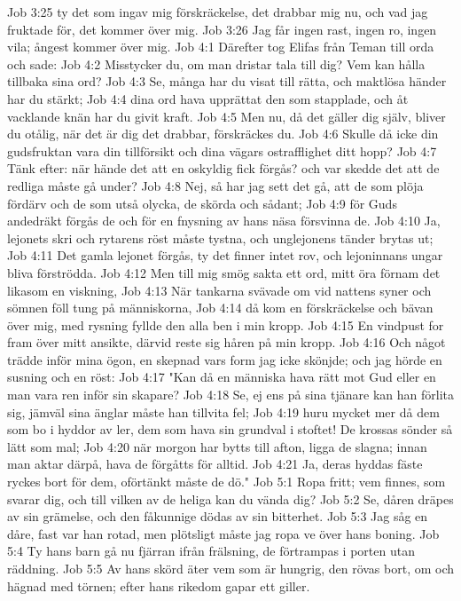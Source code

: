 Job 3:25  ty det som ingav mig förskräckelse, det drabbar mig nu, och vad jag fruktade för, det kommer över mig.
Job 3:26  Jag får ingen rast, ingen ro, ingen vila; ångest kommer över mig.
Job 4:1  Därefter tog Elifas från Teman till orda och sade:
Job 4:2  Misstycker du, om man dristar tala till dig? Vem kan hålla tillbaka sina ord?
Job 4:3  Se, många har du visat till rätta, och maktlösa händer har du stärkt;
Job 4:4  dina ord hava upprättat den som stapplade, och åt vacklande knän har du givit kraft.
Job 4:5  Men nu, då det gäller dig själv, bliver du otålig, när det är dig det drabbar, förskräckes du.
Job 4:6  Skulle då icke din gudsfruktan vara din tillförsikt och dina vägars ostrafflighet ditt hopp?
Job 4:7  Tänk efter: när hände det att en oskyldig fick förgås? och var skedde det att de redliga måste gå under?
Job 4:8  Nej, så har jag sett det gå, att de som plöja fördärv och de som utså olycka, de skörda och sådant;
Job 4:9  för Guds andedräkt förgås de och för en fnysning av hans näsa försvinna de.
Job 4:10  Ja, lejonets skri och rytarens röst måste tystna, och unglejonens tänder brytas ut;
Job 4:11  Det gamla lejonet förgås, ty det finner intet rov, och lejoninnans ungar bliva förströdda.
Job 4:12  Men till mig smög sakta ett ord, mitt öra förnam det likasom en viskning,
Job 4:13  När tankarna svävade om vid nattens syner och sömnen föll tung på människorna,
Job 4:14  då kom en förskräckelse och bävan över mig, med rysning fyllde den alla ben i min kropp.
Job 4:15  En vindpust for fram över mitt ansikte, därvid reste sig håren på min kropp.
Job 4:16  Och något trädde inför mina ögon, en skepnad vars form jag icke skönjde; och jag hörde en susning och en röst:
Job 4:17  "Kan då en människa hava rätt mot Gud eller en man vara ren inför sin skapare?
Job 4:18  Se, ej ens på sina tjänare kan han förlita sig, jämväl sina änglar måste han tillvita fel;
Job 4:19  huru mycket mer då dem som bo i hyddor av ler, dem som hava sin grundval i stoftet! De krossas sönder så lätt som mal;
Job 4:20  när morgon har bytts till afton, ligga de slagna; innan man aktar därpå, hava de förgåtts för alltid.
Job 4:21  Ja, deras hyddas fäste ryckes bort för dem, oförtänkt måste de dö."
Job 5:1  Ropa fritt; vem finnes, som svarar dig, och till vilken av de heliga kan du vända dig?
Job 5:2  Se, dåren dräpes av sin grämelse, och den fåkunnige dödas av sin bitterhet.
Job 5:3  Jag såg en dåre, fast var han rotad, men plötsligt måste jag ropa ve över hans boning.
Job 5:4  Ty hans barn gå nu fjärran ifrån frälsning, de förtrampas i porten utan räddning.
Job 5:5  Av hans skörd äter vem som är hungrig, den rövas bort, om och hägnad med törnen; efter hans rikedom gapar ett giller.
